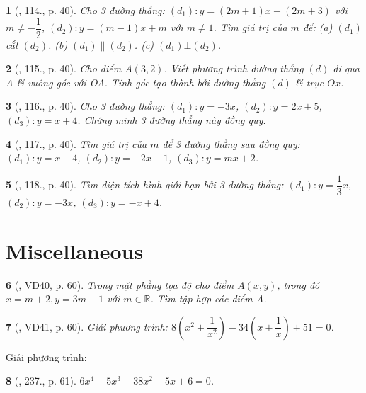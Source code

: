 \documentclass{article}
\newtheorem{baitoan}{}
\begin{document}
\begin{baitoan}[\cite{Tuyen_Toan_9_old}, 114., p. 40]
	Cho 3 đường thẳng: $(d_1):y = (2m + 1)x - (2m + 3)$ với $m\ne-\dfrac{1}{2}$, $(d_2):y = (m - 1)x + m$ với $m\ne1$. Tìm giá trị của $m$ để: (a) $(d_1)$ cắt $(d_2)$. (b) $(d_1)\parallel(d_2)$. (c) $(d_1)\bot(d_2)$.
\end{baitoan}

\begin{baitoan}[\cite{Tuyen_Toan_9_old}, 115., p. 40]
	Cho điểm $A(3,2)$. Viết phương trình đường thẳng $(d)$ đi qua A \& vuông góc với OA. Tính góc tạo thành bởi đường thẳng $(d)$ \& trục $Ox$.
\end{baitoan}

\begin{baitoan}[\cite{Tuyen_Toan_9_old}, 116., p. 40]
	Cho 3 đường thẳng: $(d_1):y = -3x$, $(d_2):y = 2x + 5$, $(d_3):y = x + 4$. Chứng minh 3 đường thẳng này đồng quy.
\end{baitoan}

\begin{baitoan}[\cite{Tuyen_Toan_9_old}, 117., p. 40]
	Tìm giá trị của $m$ để 3 đường thẳng sau đồng quy: $(d_1):y = x - 4$, $(d_2):y = -2x - 1$, $(d_3):y = mx + 2$.
\end{baitoan}

\begin{baitoan}[\cite{Tuyen_Toan_9_old}, 118., p. 40]
	Tìm diện tích hình giới hạn bởi 3 đường thẳng: $(d_1):y = \dfrac{1}{3}x$, $(d_2):y = -3x$, $(d_3):y = -x + 4$.
\end{baitoan}


\section{Miscellaneous}

\begin{baitoan}[\cite{Tuyen_Toan_8}, VD40, p. 60]
	Trong mặt phẳng tọa độ cho điểm $A(x,y)$, trong đó $x = m + 2,y = 3m - 1$ với $m\in\mathbb{R}$. Tìm tập hợp các điểm A.
\end{baitoan}

\begin{baitoan}[\cite{Tuyen_Toan_8}, VD41, p. 60]
	Giải phương trình: $8\left(x^2 + \dfrac{1}{x^2}\right) - 34\left(x + \dfrac{1}{x}\right) + 51 = 0$.
\end{baitoan}
Giải phương trình:

\begin{baitoan}[\cite{Tuyen_Toan_8}, 237., p. 61]
	$6x^4 - 5x^3 - 38x^2 - 5x + 6 = 0$.
\end{baitoan}
\end{document}
